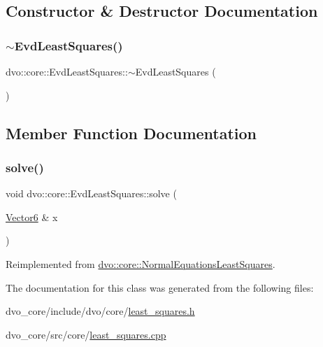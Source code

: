 \subsection{Constructor \& Destructor Documentation}
\mbox{\label{classdvo_1_1core_1_1_evd_least_squares_a560024b449e22ea0da7565b5d798b154}} 
\subsubsection{\texorpdfstring{$\sim$\+Evd\+Least\+Squares()}{~EvdLeastSquares()}}
{\footnotesize\ttfamily dvo\+::core\+::\+Evd\+Least\+Squares\+::$\sim$\+Evd\+Least\+Squares (\begin{DoxyParamCaption}{ }\end{DoxyParamCaption})\hspace{0.3cm}{\ttfamily [virtual]}}



\subsection{Member Function Documentation}
\mbox{\label{classdvo_1_1core_1_1_evd_least_squares_a7264139b3006d803039707c4318d2451}} 
\subsubsection{\texorpdfstring{solve()}{solve()}}
{\footnotesize\ttfamily void dvo\+::core\+::\+Evd\+Least\+Squares\+::solve (\begin{DoxyParamCaption}\item[{\mbox{\hyperlink{namespacedvo_1_1core_a05327f3312d32a301bce9fccda9e5807}{Vector6}} \&}]{x }\end{DoxyParamCaption})\hspace{0.3cm}{\ttfamily [virtual]}}



Reimplemented from \mbox{\hyperlink{classdvo_1_1core_1_1_normal_equations_least_squares_a8a25d3970f6506df2066995f2f2effda}{dvo\+::core\+::\+Normal\+Equations\+Least\+Squares}}.



The documentation for this class was generated from the following files\+:\begin{DoxyCompactItemize}
\item 
dvo\+\_\+core/include/dvo/core/\mbox{\hyperlink{least__squares_8h}{least\+\_\+squares.\+h}}\item 
dvo\+\_\+core/src/core/\mbox{\hyperlink{least__squares_8cpp}{least\+\_\+squares.\+cpp}}\end{DoxyCompactItemize}
